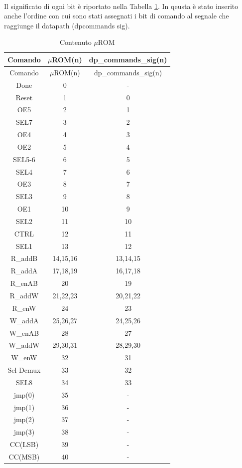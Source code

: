 \documentclass[a4paper, titlepage]{article}
\begin{document}
\noindent \\Il  significato di ogni bit è riportato nella Tabella \ref{tab:Contenuto microROM}. In qeusta è stato inserito anche l'ordine con cui sono stati assegnati i bit di comando al segnale che raggiunge il datapath (dp\textunderscore commands \textunderscore sig).
\begin{longtable}{*3c}
\caption{Contenuto $\mu$ROM}
\label{tab:Contenuto microROM}\\
\toprule
Comando & $\mu$ROM(n) & dp\_commands\_sig(n)\\
\midrule
\endfirsthead
Comando &  $\mu$ROM(n) & dp\_commands\_sig(n)\\
\midrule
\endhead
\midrule
\endfoot
\bottomrule
\endlastfoot
Done & 0 & - \\ 
Reset & 1 & 0 \\
OE5 & 2 & 1  \\
SEL7 & 3 & 2  \\
OE4 & 4 & 3 \\
OE2 & 5 & 4 \\
SEL5-6 & 6 & 5 \\
SEL4 & 7 & 6 \\
OE3 & 8 & 7 \\
SEL3 & 9 & 8 \\
OE1 & 10 & 9 \\
SEL2 & 11 & 10 \\
CTRL & 12 & 11 \\
SEL1 & 13 & 12 \\
R\_{addB} & 14,15,16 & 13,14,15 \\
R\_{addA} & 17,18,19 & 16,17,18 \\
R\_{enAB} & 20 & 19 \\
R\_{addW} & 21,22,23 & 20,21,22 \\
R\_{enW} & 24 & 23 \\
W\_{addA} & 25,26,27 & 24,25,26 \\
W\_{enAB} & 28 & 27 \\
W\_{addW} & 29,30,31 & 28,29,30 \\
W\_{enW} & 32 & 31 \\
Sel Demux & 33 & 32\\
SEL8 & 34 & 33\\
jmp(0) & 35 & -\\
jmp(1) & 36 & -\\
jmp(2) & 37 & -\\
jmp(3) & 38 & -\\
CC(LSB) & 39 & -\\
CC(MSB) & 40 & -\\
\end{longtable}
\newpage
\end{document}
